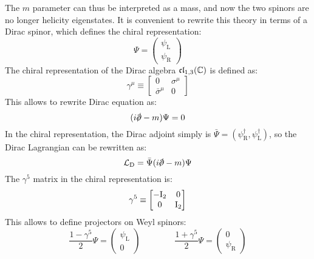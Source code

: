 The $ m $ parameter can thus be interpreted as a mass, and now the two spinors are no longer helicity eigenstates. It is convenient to rewrite this theory in terms of a Dirac spinor, which defines the chiral representation:
\begin{equation*}
  \Psi =
  \begin{pmatrix}
    \psi_\text{L} \\
    \psi_\text{R}
  \end{pmatrix}
\end{equation*}
The chiral representation of the Dirac algebra $ \mathfrak{cl}_{1,3}(\mathbb{C}) $ is defined as\footnotemark:
\begin{equation*}
  \gamma^\mu \equiv
  \begin{bmatrix}
    0 & \sigma^\mu \\
    \bar{\sigma}^\mu & 0
  \end{bmatrix}
\end{equation*}
%
%
This allows to rewrite Dirac equation as:
\begin{equation}
  (i \slashed{\pa} - m) \Psi = 0
\end{equation}
In the chiral representation, the Dirac adjoint simply is $ \bar{\Psi} = (\psi_\text{R}^\dagger, \psi_\text{L}^\dagger) $, so the Dirac Lagrangian can be rewritten as:
\begin{equation}
  \lag_\text{D} = \bar{\Psi} (i \slashed{\pa} - m) \Psi
  \label{eq:dirac-lagrangian}
\end{equation}
The $ \gamma^5 $ matrix in the chiral representation is:
\begin{equation*}
  \gamma^5 \equiv
  \begin{bmatrix}
    -\mathrm{I}_2 & 0 \\ 0 & \mathrm{I}_2
  \end{bmatrix}
\end{equation*}
This allows to define projectors on Weyl spinors:
\begin{equation}
  \frac{1 - \gamma^5}{2} \Psi =
  \begin{pmatrix}
    \psi_\text{L} \\ 0
  \end{pmatrix}
  \qquad \qquad
  \frac{1 + \gamma^5}{2} \Psi =
  \begin{pmatrix}
    0 \\ \psi_\text{R}
  \end{pmatrix}
\end{equation}

